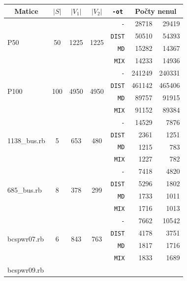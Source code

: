 \documentclass{ctuthesis}
\theoremstyle{plain}
\theoremstyle{definition}
\begin{document}
\bigskip
{\noindent
\footnotesize
  \centering
  \renewcommand{\arraystretch}{1.1}
\begin{longtable}{|l|c|c|c|r|r|r|}
  \hline
  \multicolumn{1}{|c|}{Matice} & \multicolumn{1}{|c|}{$|S|$}    &\multicolumn{1}{|c|}{$|V_1|$} &\multicolumn{1}{|c|}{$|V_2|$} & \multicolumn{1}{|c|}{\texttt{-ot}} & \multicolumn{2}{c|}{Počty nenul} \\
  \hline
  \multirow{4}{*}{P50}
    &	\multirow{4}{*}{50}	&	\multirow{4}{*}{1225}	&	\multirow{4}{*}{1225}	&\texttt{-} &	28718	&	29419	\\
    &	&	&	&\texttt{DIST} &	50510	&	54393	\\
    &	&	&	&\texttt{MD} &	15282	&	14367	\\
    &	&	&	&\texttt{MIX} &	14233	&	14936	\\
    \hline
  \multirow{4}{*}{P100}
    &	\multirow{4}{*}{100}	&	\multirow{4}{*}{4950}	&	\multirow{4}{*}{4950}	&\texttt{-}&	241249	&	240331	\\
    &	&	&	&\texttt{DIST}&	461142	&	465406	\\
    &	&	&	&\texttt{MD}&	89757	&	91915	\\
    &	&	&	&\texttt{MIX}&	91152	&	89384	\\
    \hline
  \multirow{4}{*}{1138\_bus.rb}
    &	\multirow{4}{*}{5}	&	\multirow{4}{*}{653}	&	\multirow{4}{*}{480}	&\texttt{-}    &	14529	&	7876	\\
    & & & &\texttt{DIST} &	2361	&	1251	\\
    & & & &\texttt{MD}   &	1215	&	783	\\
    & & & &\texttt{MIX}  &	1227	&	782	\\
    \hline
  \multirow{4}{*}{685\_bus.rb	}
    &	\multirow{4}{*}{8}	&	\multirow{4}{*}{378}	&	\multirow{4}{*}{299}	&\texttt{-}    &	7418	&	4820	\\
    & & & &\texttt{DIST} &	5296	&	1802	\\
    & & & &\texttt{MD}   &	1733	&	1011	\\
    & & & &\texttt{MIX}  &	1716	&	1013	\\
    \hline
  \multirow{4}{*}{bcspwr07.rb	}
    &	\multirow{4}{*}{6}	&	\multirow{4}{*}{843}	&	\multirow{4}{*}{763}	&\texttt{-}    &	7662	&	10542	\\
    & & & &\texttt{DIST} &	4178	&	3751	\\
    & & & &\texttt{MD}   &	1817	&	1716	\\
    & & & &\texttt{MIX}  &	1833	&	1689	\\
    \hline
  \multirow{4}{*}{bcspwr09.rb	}

\end{longtable}}
\end{document}
